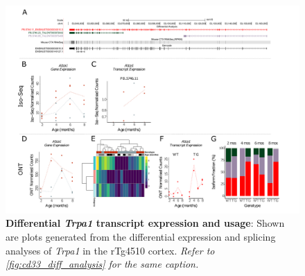 \begin{landscape}
	\begin{figure}[htp]
		\begin{center}
			\includegraphics[page=19,trim={0 0.5cm 0 1.5cm},scale =0.85]{Figures/TargetGene_DifferentialAnalysis.pdf}
		\end{center}
		\captionsetup{width=1.5\textwidth}
		\caption[Differential \textit{Trpa1} transcript expression and usage]%
		{\textbf{Differential \textit{Trpa1} transcript expression and usage}: Shown are plots generated from the differential expression and splicing analyses of \textit{Trpa1} in the rTg4510 cortex. \textit{Refer to \cref{fig:cd33_diff_analysis} for the same caption.}}   
		\label{fig:Trpa1_diff_analysis}
	\end{figure}
\end{landscape}

